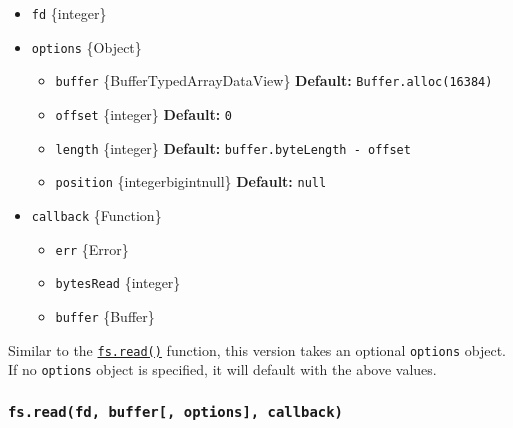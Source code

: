 \begin{itemize}
\tightlist
\item
  \texttt{fd} \{integer\}
\item
  \texttt{options} \{Object\}

  \begin{itemize}
  \tightlist
  \item
    \texttt{buffer} \{Buffer\textbar TypedArray\textbar DataView\}
    \textbf{Default:} \texttt{Buffer.alloc(16384)}
  \item
    \texttt{offset} \{integer\} \textbf{Default:} \texttt{0}
  \item
    \texttt{length} \{integer\} \textbf{Default:}
    \texttt{buffer.byteLength\ -\ offset}
  \item
    \texttt{position} \{integer\textbar bigint\textbar null\}
    \textbf{Default:} \texttt{null}
  \end{itemize}
\item
  \texttt{callback} \{Function\}

  \begin{itemize}
  \tightlist
  \item
    \texttt{err} \{Error\}
  \item
    \texttt{bytesRead} \{integer\}
  \item
    \texttt{buffer} \{Buffer\}
  \end{itemize}
\end{itemize}

Similar to the
\hyperref[fsreadfd-buffer-offset-length-position-callback]{\texttt{fs.read()}}
function, this version takes an optional \texttt{options} object. If no
\texttt{options} object is specified, it will default with the above
values.

\subsubsection{\texorpdfstring{\texttt{fs.read(fd,\ buffer{[},\ options{]},\ callback)}}{fs.read(fd, buffer{[}, options{]}, callback)}}\label{fs.readfd-buffer-options-callback}

